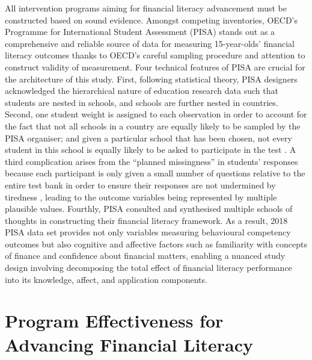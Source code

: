 \documentclass[a4paper,11pt,UKenglish,twoside,openright]{report}\usepackage[]{graphicx}\usepackage[]{color}
\begin{document}
All intervention programs aiming for financial literacy advancement must be constructed based on sound evidence. Amongst competing inventories, OECD's Programme for International Student Assessment (PISA) stands out as a comprehensive and reliable source of data for measuring 15-year-olds' financial literacy outcomes thanks to OECD's careful sampling procedure and attention to construct validity of measurement. Four technical features of PISA are crucial for the architecture of this study. First, following statistical theory, PISA designers acknowledged the hierarchical nature of education research data such that students are nested in schools, and schools are further nested in countries. Second, one student weight is assigned to each observation in order to account for the fact that not all schools in a country are equally likely to be sampled by the PISA organiser; and given a particular school that has been chosen, not every student in this school is equally likely to be asked to participate in the test \parencite{rust:2014}. A third complication arises from the ``planned missingness'' in students' responses because each participant is only given a small number of questions relative to the entire test bank in order to ensure their responses are not undermined by tiredness \parencite{vondavier:2014}, leading to the outcome variables being represented by multiple plausible values. Fourthly, PISA consulted and synthesised multiple schools of thoughts \parencite{PISAframework} in constructing their financial literacy framework. As a result, 2018 PISA data set \parencite{FLdata} provides not only variables measuring behavioural competency outcomes but also cognitive and affective factors such as familiarity with concepts of finance and confidence about financial matters, enabling a nuanced study design involving decomposing the total effect of financial literacy performance into its knowledge, affect, and application components.

\section{Program Effectiveness for Advancing Financial Literacy}
\end{document}
